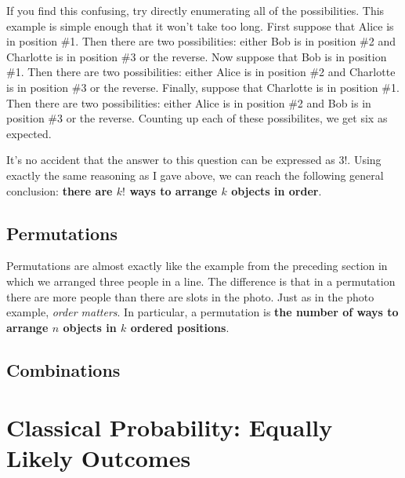 \documentclass[12pt]{article}
\begin{document}
If you find this confusing, try directly enumerating all of the possibilities.
This example is simple enough that it won't take too long.
First suppose that Alice is in position \#1.
Then there are two possibilities: either Bob is in position \#2 and Charlotte is in position \#3 or the reverse.
Now suppose that Bob is in position \#1.
Then there are two possibilities: either Alice is in position \#2 and Charlotte is in position \#3 or the reverse.
Finally, suppose that Charlotte is in position \#1.
Then there are two possibilities: either Alice is in position \#2 and Bob is in position \#3 or the reverse.
Counting up each of these possibilites, we get six as expected.

It's no accident that the answer to this question can be expressed as $3!$.
Using exactly the same reasoning as I gave above, we can reach the following general conclusion: \textbf{there are $k!$ ways to arrange $k$ objects in order}.

\subsection*{Permutations}
Permutations are almost exactly like the example from the preceding section in which we arranged three people in a line.
The difference is that in a permutation there are more people than there are slots in the photo.
Just as in the photo example, \emph{order matters}.
In particular, a permutation is \textbf{the number of ways to arrange $n$ objects in $k$ ordered positions}.


\subsection*{Combinations}

\section*{Classical Probability: Equally Likely Outcomes}
\end{document}
